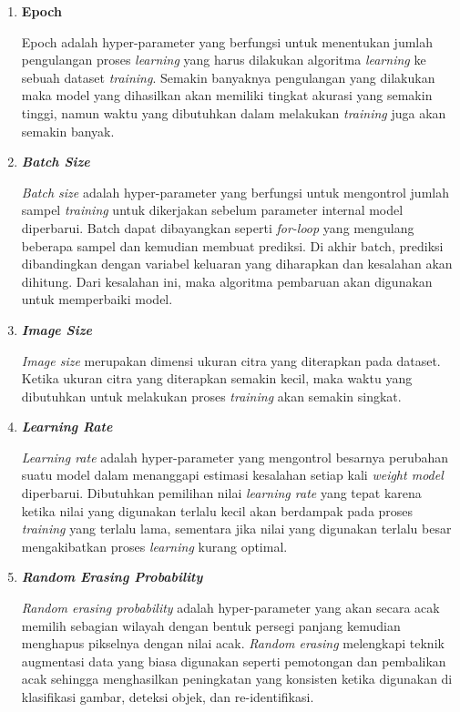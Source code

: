 \begin{enumerate}[nolistsep]

  \item \textbf{Epoch}
  
  Epoch adalah hyper-parameter yang berfungsi untuk menentukan jumlah pengulangan proses \emph{learning} 
  yang harus dilakukan algoritma \emph{learning} ke sebuah dataset \emph{training}. Semakin banyaknya 
  pengulangan yang dilakukan maka model yang dihasilkan akan memiliki tingkat akurasi yang semakin 
  tinggi, namun waktu yang dibutuhkan dalam melakukan \emph{training} juga akan semakin banyak.

  \item \textbf{\emph{Batch Size}}
  
  \emph{Batch size} adalah hyper-parameter yang berfungsi untuk mengontrol jumlah sampel \linebreak \emph{training} 
  untuk dikerjakan sebelum parameter internal model diperbarui. Batch dapat dibayangkan seperti \emph{for-loop} 
  yang mengulang beberapa sampel dan kemudian membuat prediksi. Di akhir batch, prediksi dibandingkan 
  dengan variabel keluaran yang diharapkan dan kesalahan akan dihitung. Dari kesalahan ini, maka algoritma 
  pembaruan akan digunakan untuk memperbaiki model. 

  \item \textbf{\emph{Image Size}}
  
  \emph{Image size} merupakan dimensi ukuran citra yang diterapkan pada dataset. Ketika ukuran citra yang 
  diterapkan semakin kecil, maka waktu yang dibutuhkan untuk melakukan proses \emph{training} akan semakin singkat. 

  \item \textbf{\emph{Learning Rate}}
  
  \emph{Learning rate} adalah hyper-parameter yang mengontrol besarnya perubahan suatu model dalam menanggapi 
  estimasi kesalahan setiap kali \emph{weight model} diperbarui. Dibutuhkan pemilihan nilai \emph{learning rate} 
  yang tepat karena ketika nilai yang digunakan terlalu kecil akan berdampak pada proses \emph{training} yang 
  terlalu lama, sementara jika nilai yang digunakan terlalu besar mengakibatkan proses \emph{learning} kurang 
  optimal.


  \item \textbf{\emph{Random Erasing Probability}}
  
  \emph{Random erasing probability} adalah hyper-parameter yang akan secara acak memilih sebagian wilayah dengan 
  bentuk persegi panjang kemudian menghapus pikselnya dengan nilai acak. \emph{Random erasing} melengkapi teknik 
  augmentasi data yang biasa digunakan seperti pemotongan dan pembalikan acak sehingga menghasilkan peningkatan yang 
  konsisten ketika digunakan di klasifikasi gambar, deteksi objek, dan re-identifikasi.

\end{enumerate}

